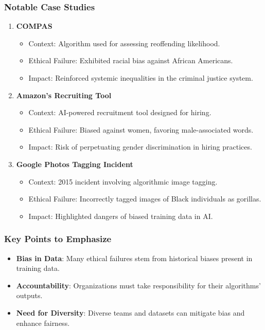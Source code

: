\documentclass[aspectratio=169]{beamer}
\begin{document}
\begin{frame}[fragile]
    \frametitle{Notable Case Studies}
    \begin{enumerate}
        \item \textbf{COMPAS}
            \begin{itemize}
                \item Context: Algorithm used for assessing reoffending likelihood.
                \item Ethical Failure: Exhibited racial bias against African Americans.
                \item Impact: Reinforced systemic inequalities in the criminal justice system.
            \end{itemize}
    
        \item \textbf{Amazon’s Recruiting Tool}
            \begin{itemize}
                \item Context: AI-powered recruitment tool designed for hiring.
                \item Ethical Failure: Biased against women, favoring male-associated words.
                \item Impact: Risk of perpetuating gender discrimination in hiring practices.
            \end{itemize}
    
        \item \textbf{Google Photos Tagging Incident}
            \begin{itemize}
                \item Context: 2015 incident involving algorithmic image tagging.
                \item Ethical Failure: Incorrectly tagged images of Black individuals as gorillas.
                \item Impact: Highlighted dangers of biased training data in AI.
            \end{itemize}
    \end{enumerate}
\end{frame}

\begin{frame}[fragile]
    \frametitle{Key Points to Emphasize}
    \begin{itemize}
        \item \textbf{Bias in Data}: Many ethical failures stem from historical biases present in training data.
        \item \textbf{Accountability}: Organizations must take responsibility for their algorithms' outputs.
        \item \textbf{Need for Diversity}: Diverse teams and datasets can mitigate bias and enhance fairness.
    \end{itemize}
\end{frame}
\end{document}
